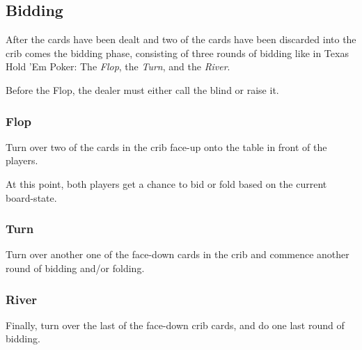 \subsection{Bidding}

After the cards have been dealt and two of the cards have been discarded into the crib comes the bidding phase, consisting of three rounds of bidding like in Texas Hold 'Em Poker: The \textit{Flop}, the \textit{Turn}, and the \textit{River}.

Before the Flop, the dealer must either call the blind or raise it.

\subsubsection{Flop}
Turn over two of the cards in the crib face-up onto the table in front of the players.

At this point, both players get a chance to bid or fold based on the current board-state.

\subsubsection{Turn}
Turn over another one of the face-down cards in the crib and commence another round of bidding and/or folding.

\subsubsection{River}
Finally, turn over the last of the face-down crib cards, and do one last round of bidding.